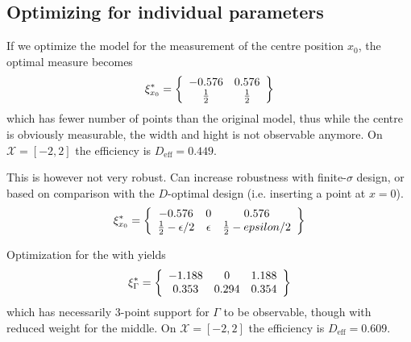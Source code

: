 \documentclass[12pt]{iopart}
\begin{document}
\subsection{Optimizing for individual parameters}
\label{seq:exopts}

If we optimize the model  for the measurement of the centre position $x_0$, the optimal measure becomes
\begin{equation}
\xi^*_{x_0} = \left\{
  \begin{array}{c c}
    -0.576 & 0.576 \\
    \frac{1}{2} & \frac{1}{2}\\
  \end{array} \right \}
\end{equation}
which has fewer number of points than the original model, thus while the centre is obviously measurable, the width and hight is not observable anymore.  On $\mathcal{X} = [-2,2]$ the efficiency is $D_\mathrm{eff} = 0.449$.

This is however not very robust. Can increase robustness with finite-$\sigma$ design, or based on comparison with the $D$-optimal design (i.e. inserting a point at $x=0$).
\begin{equation}
\xi^*_{x_0} = \left\{
  \begin{array}{c c c}
    -0.576 & 0 & 0.576 \\
    \frac{1}{2}-\epsilon/2 & \epsilon & \frac{1}{2}-epsilon/2\\
  \end{array} \right \}
\label{eq:dsx0robust}
\end{equation}


Optimization for the with yields
\begin{equation}
\xi^*_{\Gamma} = \left\{
  \begin{array}{c c c}
    -1.188 & 0 &  1.188 \\
    0.353 & 0.294 & 0.354\\
  \end{array} \right \}
\end{equation}
which has necessarily 3-point support for $\Gamma$ to be observable, though with reduced weight for the middle. On $\mathcal{X} = [-2,2]$ the efficiency is $D_\mathrm{eff} = 0.609$.
\end{document}
